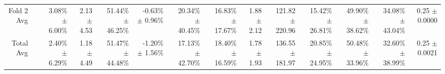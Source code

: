 \begin{table}[H]
{\begin{tabular}{rrrrrrrrrrrrrr}
Fold 2 Avg &  & \shortstack{3.08\% \\ $\pm$ 6.00\%} & \shortstack{2.13 \\ $\pm$ 4.53} & \shortstack{51.44\% \\ $\pm$ 46.25\%} & \shortstack{-0.63\% \\ $\pm$ 0.96\%} & \shortstack{20.34\% \\ $\pm$ 40.45\%} & \shortstack{16.83\% \\ $\pm$ 17.67\%} & \shortstack{1.88 \\ $\pm$ 2.12} & \shortstack{121.82 \\ $\pm$ 220.96} & \shortstack{15.42\% \\ $\pm$ 26.81\%} & \shortstack{49.90\% \\ $\pm$ 38.62\%} & \shortstack{34.08\% \\ $\pm$ 43.04\%} & \shortstack{0.25 \\ $\pm$ 0.0000} \\
Total Avg &  & \shortstack{2.40\% \\ $\pm$ 6.29\%} & \shortstack{1.18 \\ $\pm$ 4.49} & \shortstack{51.47\% \\ $\pm$ 44.48\%} & \shortstack{-1.20\% \\ $\pm$ 1.56\%} & \shortstack{17.13\% \\ $\pm$ 42.70\%} & \shortstack{18.40\% \\ $\pm$ 16.59\%} & \shortstack{1.78 \\ $\pm$ 1.93} & \shortstack{136.55 \\ $\pm$ 181.97} & \shortstack{20.85\% \\ $\pm$ 24.95\%} & \shortstack{50.48\% \\ $\pm$ 33.96\%} & \shortstack{32.60\% \\ $\pm$ 38.99\%} & \shortstack{0.25 \\ $\pm$ 0.0021} \\
\bottomrule
\end{tabular}}
\end{table}
